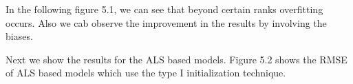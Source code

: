 In the following figure 5.1, we can see that beyond certain ranks overfitting
occurs. Also we cab observe the improvement in the results by involving the
biases. 

Next we show the results for the ALS based models. Figure 5.2 shows the RMSE of
ALS based models which use the type I initialization technique. 


\begin{figure}[h!]
\centering
{}
\\
\end{figure}
